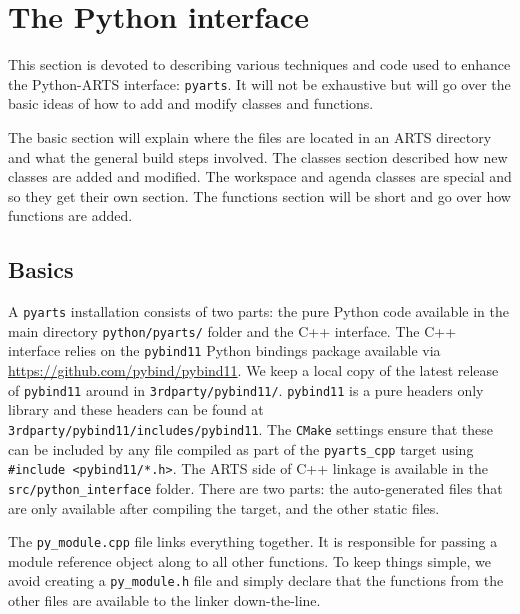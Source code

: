 \chapter{The Python interface}

This section is devoted to describing various techniques and code used to enhance the Python-ARTS interface: \texttt{pyarts}.
It will not be exhaustive but will go over the basic ideas of how to add and modify classes and functions.

The basic section will explain where the files are located in an ARTS directory and what the general build steps involved. 
 The classes section described how new classes are added and modified.  
 The workspace and agenda classes are special and so they get their own section.  
 The functions section will be short and go over how functions are added.

\section{Basics}
A \texttt{pyarts} installation consists of two parts: the pure Python code available in the main directory \verb|python/pyarts/| folder and the C++ interface.
The C++ interface relies on the \texttt{pybind11} Python bindings package available via \url{https://github.com/pybind/pybind11}.
We keep a local copy of the latest release of \texttt{pybind11} around in \verb|3rdparty/pybind11/|.
\texttt{pybind11} is a pure headers only library and these headers can be found at \verb|3rdparty/pybind11/includes/pybind11|.
The \verb|CMake| settings ensure that these can be included by any file compiled as part of the \texttt{pyarts_cpp} target using
\texttt{#include <pybind11/*.h>}.
The ARTS side of C++ linkage is available in the \verb|src/python_interface| folder.  There are two parts: the auto-generated files
that are only available after compiling the target, and the other static files.

The \verb|py_module.cpp| file links everything together.
It is responsible for passing a module reference object along to all other functions.
To keep things simple, we avoid creating a \verb|py_module.h| file and simply declare
that the functions from the other files are available to the linker down-the-line.

